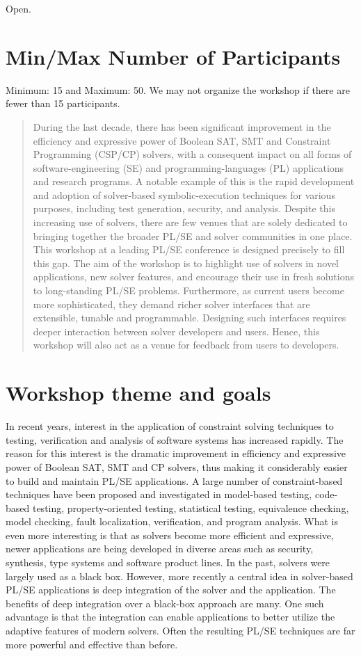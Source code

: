 \documentclass{sig-alternate}
\begin{document}
Open.

\section{Min/Max Number of Participants}

Minimum: 15 and Maximum: 50. We may not organize the workshop if
there are fewer than 15 participants.

\begin{abstract}
During the last decade, there has been significant improvement in the
efficiency and expressive power of Boolean SAT, SMT and Constraint Programming
(CSP/CP) solvers, with a consequent impact on all forms of software-engineering (SE) and programming-languages (PL) applications and research programs. A notable example of this
is the rapid development and adoption of solver-based symbolic-execution
techniques for various purposes, including test generation, security, and
analysis. Despite this increasing use of solvers, there are few venues that are
solely dedicated to bringing together the broader PL/SE and solver communities
in one place. This workshop at a leading PL/SE conference is designed precisely
to fill this gap. The aim of the workshop is to highlight use of solvers in
novel applications, new solver features, and encourage their use in fresh
solutions to long-standing PL/SE problems. Furthermore, as current users become
more sophisticated, they demand richer solver interfaces that are extensible,
tunable and programmable. Designing such interfaces requires deeper interaction 
between solver developers and users. Hence, this workshop will also act as a
venue for feedback from users to developers.

\end{abstract}

\section{Workshop theme and goals}
In recent years, interest in the
application of constraint solving techniques to testing, verification
and analysis of software systems has increased rapidly. The reason for this interest is the
dramatic improvement in efficiency and expressive power of Boolean
SAT, SMT and CP solvers, thus making it considerably easier to build
and maintain PL/SE applications. A large
number of constraint-based techniques have been proposed and
investigated in model-based testing, code-based testing,
property-oriented testing, statistical testing, equivalence checking,
model checking, fault localization, verification, and program
analysis.  What is even more interesting is that as solvers become
more efficient and expressive, newer applications are being developed
in diverse areas such as security, synthesis, type systems and
software product lines. In the past, solvers were largely used as
a black box. However, more recently a central idea in solver-based PL/SE
applications is deep integration of the solver and the application. The
benefits of deep integration over a black-box approach are many. One such advantage is that the integration can enable
applications to better utilize the adaptive features of modern
solvers. Often the resulting PL/SE techniques are far more powerful and
effective than before.
\end{document}
